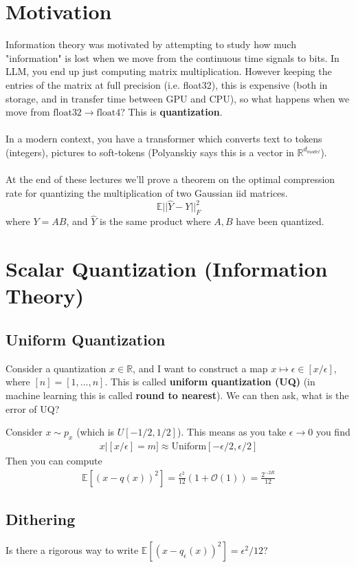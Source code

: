 \section{Motivation}
Information theory was motivated by attempting to study how much "information" is lost when we move from the continuous time signals to bits. In LLM, you end up just computing matrix multiplication. However keeping the entries of the matrix at full precision (i.e. float32), this is expensive (both in storage, and in transfer time between GPU and CPU), so what happens when we move from $\text{float}32 \to \text{float}4$? This is \textbf{quantization}.
\\
\\
In a modern context, you have a transformer which converts text to tokens (integers), pictures to soft-tokens (Polyanskiy says this is a vector in $\mathbb R^{d_{model}}$). \\
\\
At the end of these lectures we'll prove a theorem on the optimal compression rate for quantizing the multiplication of two Gaussian iid matrices.
$$
\mathbb E || \hat Y - Y||_F^2
$$
where $Y = A B$, and $\hat Y$ is the same product where $A,B$ have been quantized.

\section{Scalar Quantization (Information Theory)}
\subsection{Uniform Quantization}
Consider a quantization $x \in \mathbb R$, and I want to construct a map $x \mapsto \epsilon \in [x / \epsilon]$, where $[n] = [1,...,n]$. This is called \textbf{uniform quantization (UQ)} (in machine learning this is called \textbf{round to nearest}). We can then ask, what is the error of UQ?

Consider $x \sim p_x$ (which is $U[-1/2, 1/2]$). This means as you take $\epsilon \to 0$ you find
\begin{align}
	x | [x/\epsilon] = m] \approx \text{Uniform}[-\epsilon /2, \epsilon/2]
\end{align}
Then you can compute
\begin{align}
	\mathbb E[(x -q(x))^2]  = \frac{\epsilon^2}{12} (1 + \mathcal O(1))=  \frac{2^{-2R}}{12}
\end{align}

\subsection{Dithering}
Is there a rigorous way to write $\mathbb E[(x-q_\epsilon(x))^2] = \epsilon^2/12$?


